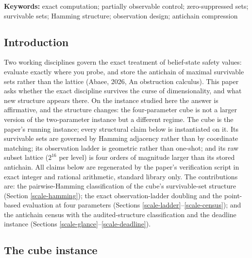 \documentclass[10pt,twocolumn]{article}
\theoremstyle{plain}
\theoremstyle{definition}
\theoremstyle{remark}
\begin{document}
\textbf{Keywords:} exact computation; partially observable control;
zero-suppressed sets; survivable sets; Hamming structure; observation
design; antichain compression

\subsection{Introduction}\label{scale-introduction}

Two working disciplines govern the exact treatment of belief-state safety values: evaluate exactly where you probe, and store the antichain of maximal survivable sets rather than the lattice (Abaee, 2026, An obstruction calculus). This paper asks whether the exact discipline survives the curse of dimensionality, and what new structure appears there. On the instance studied here the answer is affirmative, and the structure changes: the four-parameter cube is not a larger version of the two-parameter instance but a different regime. The cube is the paper's running instance; every structural claim below is instantiated on it.
Its survivable sets are governed by Hamming adjacency rather than by
coordinate matching; its observation ladder is geometric rather than
one-shot; and its raw subset lattice (\(2^{16}\) per level) is four
orders of magnitude larger than its stored antichain. All claims below
are regenerated by the paper's verification script in exact integer
and rational arithmetic, standard library only. The contributions are:
the pairwise-Hamming classification of the cube's survivable-set
structure (Section \ref{scale-hamming}); the exact observation-ladder
doubling and the point-based evaluation at four parameters (Sections
\ref{scale-ladder}--\ref{scale-census}); and the antichain census with the
audited-structure classification and the deadline instance (Sections
\ref{scale-glance}--\ref{scale-deadline}).

\subsection{The cube instance}\label{scale-instance}
\end{document}
